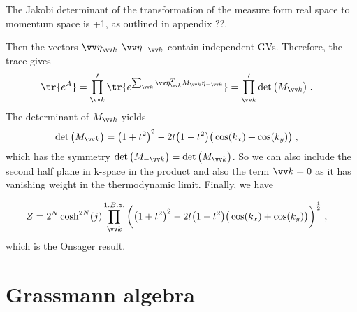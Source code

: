 The Jakobi determinant of the transformation of the measure form real space to momentum space is +1, as outlined in appendix ??.

Then the vectors $\vv\eta_{\vv k} $
$\vv\eta_{-\vv k} $ contain independent GVs. Therefore, the trace gives
%
\begin{align*}
\tr{e^{A}} &= \prod'_{\vv k} \tr{e^{\sum_{\vv k} \vv \eta_{\vv k}^{T}  M_{\vv k}  \eta_{-\vv k}}}
=\prod_{\vv k}' \det\big( M_{\vv k} \big)\;.
\end{align*}
%
The determinant of $M_{\vv k}$ yields
%
\begin{align*}
\det\big( M_{\vv k} \big) &= \big( 1+t^{2} \big)^{2} - 2 t \big(1-t^{2}\big) \big( \cos(k_{x})
+\cos(k_{y}) \big)\;,
\end{align*}
%
which has the symmetry $\det\big( M_{-\vv k} \big) = \det\big( M_{\vv k} \big)$. So we can 
also include the second half plane in k-space in the product and also the term $\vv k=0$ as it 
has vanishing weight in the thermodynamic limit.
Finally, we have 

%
\begin{align}\label{eq:}
Z &= 2^{N} \cosh^{2N}(j) \prod_{\vv k}^{1.B.z.} \bigg( \big( 1+t^{2} \big)^{2} - 2 t \big(1-t^{2}\big) \big( \cos(k_{x})
+\cos(k_{y}) \big)\bigg)^{\frac{1}{2}}\;,
\end{align}
%
which is the Onsager result.


\section{Grassmann algebra}



